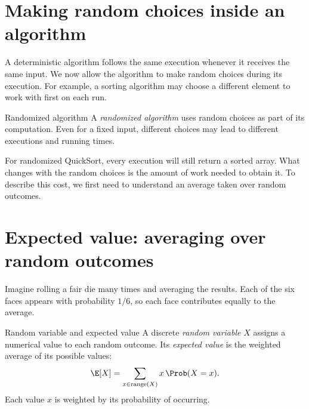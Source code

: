 \documentclass[a4paper,12pt,oneside]{report}
\begin{document}
\section{Making random choices inside an algorithm}

A deterministic algorithm follows the same execution whenever it
receives the same input. We now allow the algorithm to make random
choices during its execution. For example, a sorting algorithm may
choose a different element to work with first on each run.

\begin{frameddefn}{Randomized algorithm}\label{def:randomized-algorithm}
A \emph{randomized algorithm} uses random choices as part of its
computation. Even for a fixed input, different choices may lead to
different executions and running times.
\end{frameddefn}

For randomized QuickSort, every execution will still return a sorted
array. What changes with the random choices is the amount of work
needed to obtain it. To describe this cost, we first need to understand
an average taken over random outcomes.

\section{Expected value: averaging over random outcomes}

Imagine rolling a fair die many times and averaging the results.
Each of the six faces appears with probability $1/6$, so each face
contributes equally to the average.

\begin{frameddefn}{Random variable and expected value}\label{def:expected-value}
A discrete \emph{random variable} $X$ assigns a numerical value to
each random outcome. Its \emph{expected value} is the weighted average
of its possible values:
\[
  \E[X]=\sum_{x\in\operatorname{range}(X)}x\,\Prob(X=x).
\]
Each value $x$ is weighted by its probability of occurring.
\end{frameddefn}
\end{document}
